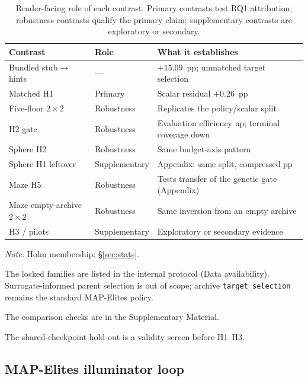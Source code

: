 \documentclass[preprint,12pt]{elsarticle}
\begin{document}
\begin{table}[!htbp]
  \centering
  \caption{Reader-facing role of each contrast. Primary contrasts test RQ1 attribution; robustness contrasts qualify the primary claim; supplementary contrasts are exploratory or secondary.}
  \label{tab:role-exp}
  \label{tab:h-status}
  \label{tab:families}
  \label{tab:rq-map}
  \small
  \begin{tabularx}{\linewidth}{@{}>{\raggedright\arraybackslash}p{3.15cm} l >{\raggedright\arraybackslash}X@{}}
    \toprule
    Contrast & Role & What it establishes \\
    \midrule
    Bundled stub$\rightarrow$hints & --- & $+15.09$~pp; unmatched target selection \\
    Matched H1 & Primary & Scalar residual $+0.26$~pp \\
    Five-floor $2\times2$ & Robustness & Replicates the policy/scalar split \\
    H2 gate & Robustness & Evaluation efficiency up; terminal coverage down \\
    Sphere H2 & Robustness & Same budget-axis pattern \\
    Sphere H1 leftover & Supplementary & Appendix: same split, compressed pp \\
    Maze H5 & Robustness & Tests transfer of the genetic gate (Appendix) \\
    Maze empty-archive $2\times2$ & Robustness & Same inversion from an empty archive \\
    H3 / pilots & Supplementary & Exploratory or secondary evidence \\
    \bottomrule
  \end{tabularx}
  \vspace{0.25em}
  \noindent\small\textit{Note:} Holm membership: \S\ref{sec:stats}.
\end{table}

The locked families are listed in the internal protocol (Data availability). Surrogate-informed parent selection is out of scope; archive \texttt{target\_selection} remains the standard MAP-Elites policy.

The comparison checks are in the Supplementary Material.

The shared-checkpoint hold-out is a validity screen before H1--H3.

\subsection{MAP-Elites illuminator loop}
\end{document}

